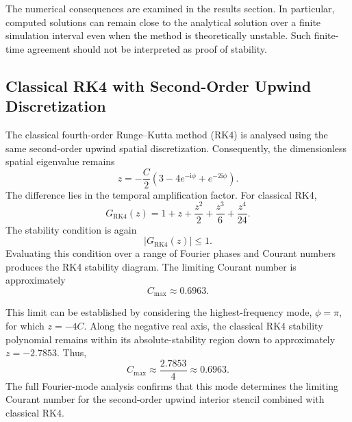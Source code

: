 The numerical consequences are examined in the results section. In particular, computed solutions can remain close to the analytical solution over a finite simulation interval even when the method is theoretically unstable. Such finite-time agreement should not be interpreted as proof of stability.

\subsection{Classical RK4 with Second-Order Upwind Discretization}
\label{subsec:rk4-upwind-stability}

The classical fourth-order Runge--Kutta method (RK4) is analysed using the same second-order upwind spatial discretization. Consequently, the dimensionless spatial eigenvalue remains
\begin{equation}
    z=-\frac{C}{2}
    \left(3-4e^{-\mathrm{i}\phi}+e^{-2\mathrm{i}\phi}\right).
    \label{eq:upwind2-rk4-z}
\end{equation}
The difference lies in the temporal amplification factor. For classical RK4,
\begin{equation}
    G_{\mathrm{RK4}}(z)
    =1+z+\frac{z^2}{2}+\frac{z^3}{6}+\frac{z^4}{24}.
    \label{eq:rk4-amplification}
\end{equation}
The stability condition is again
\begin{equation}
    \boxed{|G_{\mathrm{RK4}}(z)|\leq 1}.
    \label{eq:rk4-absolute-stability}
\end{equation}
Evaluating this condition over a range of Fourier phases and Courant numbers produces the RK4 stability diagram. The limiting Courant number is approximately
\begin{equation}
    \boxed{C_{\max}\approx 0.6963}.
    \label{eq:rk4-upwind-cfl-limit}
\end{equation}

This limit can be established by considering the highest-frequency mode, $\phi=\pi$, for which $z=-4C$. Along the negative real axis, the classical RK4 stability polynomial remains within its absolute-stability region down to approximately $z=-2.7853$. Thus,
\begin{equation}
    C_{\max}\approx\frac{2.7853}{4}\approx 0.6963.
    \label{eq:rk4-cfl-calculation}
\end{equation}
The full Fourier-mode analysis confirms that this mode determines the limiting Courant number for the second-order upwind interior stencil combined with classical RK4.

